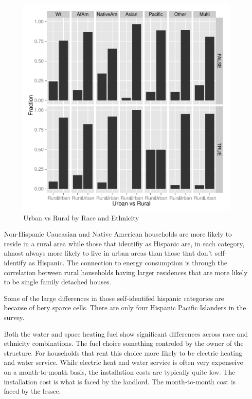 \documentclass{article}
\begin{document}
\begin{figure}[htbp]
\begin{center}
\caption{Urban vs Rural by Race and Ethnicity}
\label{fig:UrbanRural}
\includegraphics{DraftEdwardsWoods-006}
\end{center}
\end{figure}

Non-Hispanic Caucasian and Native American households are more likely to reside in a rural area while those that identifiy as Hispanic are, in each category, almost always more likely to live in urban areas than those that don't self-identify as Hispanic.  The connection to energy consumption is through the correlation between rural households having larger residences that are more likely to be single family detached houses. 

Some of the large differences in those self-identifed hispanic categories are because of bery sparce cells.  There are only four Hispanic Pacific Islanders in the survey.

Both the water and space heating fuel show significant differences across race and ethnicity combinations.  The fuel choice something controled by the owner of the structure.  For households that rent this choice more likely to be electric heating and water service.  While electric heat and water service is often very expenseive on a month-to-month basis, the installation costs are typically quite low.  The installation cost is what is faced by the landlord.  The month-to-month cost is faced by the lessee.
\end{document}
